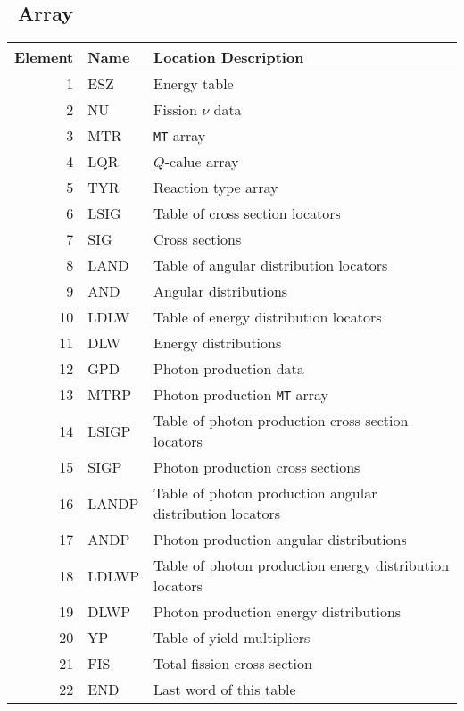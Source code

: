 \subsection{\JXS\ Array}\label{sec:JXSContinuousEnergyNeutron}
\begin{table} \centering
  \begin{tabular}{rll}
    \toprule
    Element  & Name   & Location Description \\
    \midrule
    1        & ESZ    & Energy table \\
    2        & NU     & Fission $\nu$ data \\
    3        & MTR    & \texttt{MT} array \\
    4        & LQR    & $Q$-calue array \\
    5        & TYR    & Reaction type array \\
    6        & LSIG   & Table of cross section locators \\
    7        & SIG    & Cross sections \\
    8        & LAND   & Table of angular distribution locators \\
    9        & AND    & Angular distributions \\
    10       & LDLW   & Table of energy distribution locators \\
    11       & DLW    & Energy distributions \\
    12       & GPD    & Photon production data \\
    13       & MTRP   & Photon production \texttt{MT} array \\
    14       & LSIGP  & Table of photon production cross section locators \\
    15       & SIGP   & Photon production cross sections \\
    16       & LANDP  & Table of photon production angular distribution locators \\
    17       & ANDP   & Photon production angular distributions \\
    18       & LDLWP  & Table of photon production energy distribution locators \\
    19       & DLWP   & Photon production energy distributions \\
    20       & YP     & Table of yield multipliers \\
    21       & FIS    & Total fission cross section \\
    22       & END    & Last word of this table \\

\end{tabular}
\end{table}
